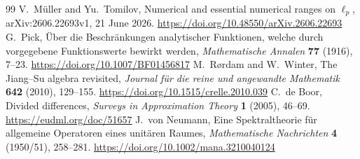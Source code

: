 \documentclass[10pt,a4paper]{amsart}
\begin{document}
\begin{thebibliography}{99}
 V.~M{\"u}ller and Yu.~Tomilov, Numerical and essential numerical ranges on $\ell_p$, arXiv:2606.22693v1, 21 June 2026. \url{https://doi.org/10.48550/arXiv.2606.22693}
 G.~Pick, \"Uber die Beschr\"ankungen analytischer Funktionen, welche durch vorgegebene Funktionswerte bewirkt werden, \emph{Mathematische Annalen} \textbf{77} (1916), 7--23. \url{https://doi.org/10.1007/BF01456817}
 M.~R{\o}rdam and W.~Winter, The Jiang--Su algebra revisited, \emph{Journal f\"ur die reine und angewandte Mathematik} \textbf{642} (2010), 129--155. \url{https://doi.org/10.1515/crelle.2010.039}
 C.~de Boor, Divided differences, \emph{Surveys in Approximation Theory} \textbf{1} (2005), 46--69. \url{https://eudml.org/doc/51657}
 J.~von Neumann, Eine Spektraltheorie f\"ur allgemeine Operatoren eines unit\"aren Raumes, \emph{Mathematische Nachrichten} \textbf{4} (1950/51), 258--281. \url{https://doi.org/10.1002/mana.3210040124}
\end{thebibliography}
\end{document}
